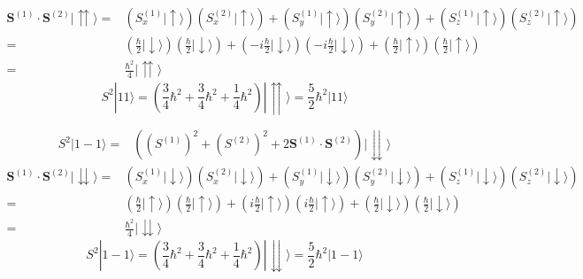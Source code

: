 \begin{enumerate}
\begin{align*}
               \bm{S}^{(1)}
               \cdot
               \bm{S}^{(2)}
               |\upuparrows\rangle
               =&
               (S_x^{(1)}|\uparrow\rangle)
               (S_x^{(2)}|\uparrow\rangle)+
               (S_y^{(1)}|\uparrow\rangle)
               (S_y^{(2)}|\uparrow\rangle)+
               (S_z^{(1)}|\uparrow\rangle)
               (S_z^{(2)}|\uparrow\rangle)\\
               =&
               (\frac{\hbar}{2}|\downarrow\rangle)
               (\frac{\hbar}{2}|\downarrow\rangle)
               +
               (-i\frac{\hbar}{2}|\downarrow\rangle)
               (-i\frac{\hbar}{2}|\downarrow\rangle)
               +
               (\frac{\hbar}{2}|\uparrow\rangle)
               (\frac{\hbar}{2}|\uparrow\rangle)\\
               =& \frac{\hbar^2}{4}|\upuparrows\rangle
           \end{align*}
           $$
           S^2|11\rangle 
           =(\frac{3}{4}\hbar^2 + 
           \frac{3}{4}\hbar^2 + 
           \frac{1}{4}\hbar^2) 
           |\upuparrows\rangle
           =\frac{5}{2}\hbar^2|11\rangle
           $$

           \begin{align*}
               S^2|1-1\rangle = 
               &
               ((S^{(1)})^2 +(S^{(2)})^2
               +2\bm{S}^{(1)}
               \cdot
               \bm{S}^{(2)})
               |\downdownarrows\rangle
           \end{align*}
           \begin{align*}
               \bm{S}^{(1)}
               \cdot
               \bm{S}^{(2)}
               |\downdownarrows\rangle
               =&
               (S_x^{(1)}|\downarrow\rangle)
               (S_x^{(2)}|\downarrow\rangle)+
               (S_y^{(1)}|\downarrow\rangle)
               (S_y^{(2)}|\downarrow\rangle)+
               (S_z^{(1)}|\downarrow\rangle)
               (S_z^{(2)}|\downarrow\rangle)\\
               =&
               (\frac{\hbar}{2}|\uparrow\rangle)
               (\frac{\hbar}{2}|\uparrow\rangle)
               +
               (i\frac{\hbar}{2}|\uparrow\rangle)
               (i\frac{\hbar}{2}|\uparrow\rangle)
               +
               (\frac{\hbar}{2}|\downarrow\rangle)
               (\frac{\hbar}{2}|\downarrow\rangle)\\
               =& \frac{\hbar^2}{4}|\downdownarrows\rangle
           \end{align*}
           $$
           S^2|1-1\rangle 
           =(\frac{3}{4}\hbar^2 + 
           \frac{3}{4}\hbar^2 + 
           \frac{1}{4}\hbar^2) 
           |\downdownarrows\rangle
           =\frac{5}{2}\hbar^2|1-1\rangle
           $$
       \end{enumerate}
